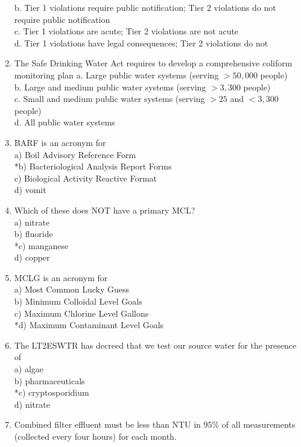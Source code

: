 \begin{enumerate}
b. Tier 1 violations require public notification; Tier 2 violations do not require public notification\\
c. Tier 1 violations are acute; Tier 2 violations are not acute\\
d. Tier 1 violations have legal consequences; Tier 2 violations do not\\
\item The Safe Drinking Water Act requires to develop a comprehensive coliform monitoring plan a. Large public water systems (serving $>50,000$ people)\\
b. Large and medium public water systems (serving $>3,300$ people)\\
c. Small and medium public water systems (serving $>25$ and $<3,300$ people)\\
d. All public water systems
\item BARF is an acronym for\\
a) Boil Advisory Reference Form\\
*b) Bacteriological Analysis Report Forms\\
c) Biological Activity Reactive Format\\
d) vomit\\
\item Which of these does NOT have a primary MCL?\\
a) nitrate\\
b) fluoride\\
*c) manganese\\
d) copper\\
\item MCLG is an acronym for\\
a) Most Common Lucky Guess\\
b) Minimum Colloidal Level Goals\\
c) Maximum Chlorine Level Gallons\\
*d) Maximum Contaminant Level Goals\\
\item The LT2ESWTR has decreed that we test our source water for the presence of\\
a) algae\\
b) pharmaceuticals\\
*c) cryptosporidium\\
d) nitrate\\
\item Combined filter effluent must be less than NTU in $95 \%$ of all measurements (collected every four hours) for each month.\\

\end{enumerate}
